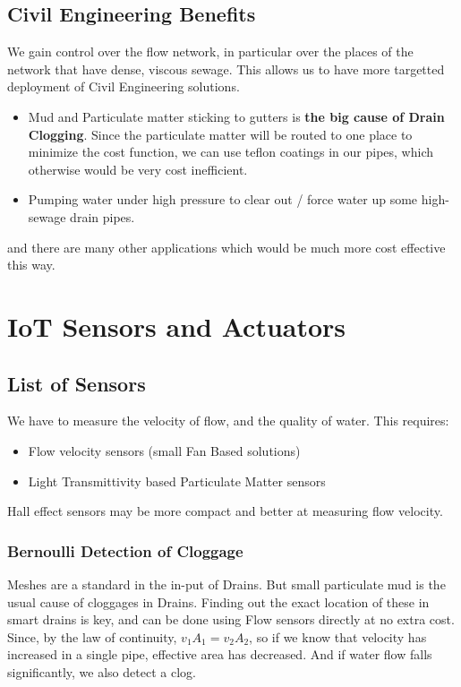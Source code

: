 \documentclass{article}
\begin{document}
\subsection{Civil Engineering Benefits}

We gain control over the flow network, in particular over the places of the network that have dense, viscous sewage. This allows us to have more targetted deployment of Civil Engineering solutions.
\begin{itemize}
    \item Mud and Particulate matter sticking to gutters is \textbf{the big cause of Drain Clogging}. Since the particulate matter will be routed to one place to minimize the cost function, we can use teflon coatings in our pipes, which otherwise would be very cost inefficient.
    \item Pumping water under high pressure to clear out / force water up some high-sewage drain pipes.
\end{itemize}
and there are many other applications which would be much more cost effective this way.

\section{IoT Sensors and Actuators}

\subsection{List of Sensors}

We have to measure the velocity of flow, and the quality of water.
This requires:
\begin{itemize}
    \item Flow velocity sensors (small Fan Based solutions)
    \item Light Transmittivity based Particulate Matter sensors
\end{itemize}
Hall effect sensors may be more compact and better at measuring flow velocity.

\subsubsection{Bernoulli Detection of Cloggage}

Meshes are a standard in the in-put of Drains. But small particulate mud is the usual cause of cloggages in Drains. Finding out the exact location of these in smart drains is key, and can be done using Flow sensors directly at no extra cost.
Since, by the law of continuity, $v_1 A_1 = v_2 A_2$, so if we know that velocity has increased in a single pipe, effective area has decreased. And if water flow falls significantly, we also detect a clog.
\end{document}
